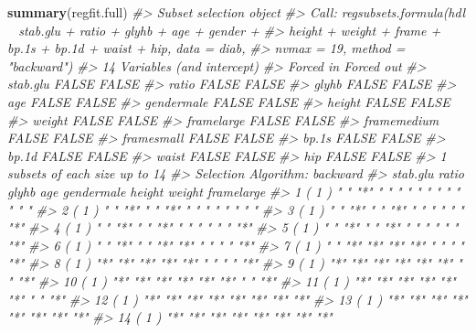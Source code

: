 \documentclass[]{book}
\newenvironment{Shaded}{\begin{snugshade}}{\end{snugshade}}
\newcommand{\CommentTok}[1]{\textcolor[rgb]{0.56,0.35,0.01}{\textit{#1}}}
\newcommand{\KeywordTok}[1]{\textcolor[rgb]{0.13,0.29,0.53}{\textbf{#1}}}
\newcommand{\NormalTok}[1]{#1}
\begin{document}
\begin{Shaded}
\begin{Highlighting}[]
\KeywordTok{summary}\NormalTok{(regfit.full)}
\CommentTok{#> Subset selection object}
\CommentTok{#> Call: regsubsets.formula(hdl ~ stab.glu + ratio + glyhb + age + gender + }
\CommentTok{#>     height + weight + frame + bp.1s + bp.1d + waist + hip, data = diab, }
\CommentTok{#>     nvmax = 19, method = "backward")}
\CommentTok{#> 14 Variables  (and intercept)}
\CommentTok{#>             Forced in Forced out}
\CommentTok{#> stab.glu        FALSE      FALSE}
\CommentTok{#> ratio           FALSE      FALSE}
\CommentTok{#> glyhb           FALSE      FALSE}
\CommentTok{#> age             FALSE      FALSE}
\CommentTok{#> gendermale      FALSE      FALSE}
\CommentTok{#> height          FALSE      FALSE}
\CommentTok{#> weight          FALSE      FALSE}
\CommentTok{#> framelarge      FALSE      FALSE}
\CommentTok{#> framemedium     FALSE      FALSE}
\CommentTok{#> framesmall      FALSE      FALSE}
\CommentTok{#> bp.1s           FALSE      FALSE}
\CommentTok{#> bp.1d           FALSE      FALSE}
\CommentTok{#> waist           FALSE      FALSE}
\CommentTok{#> hip             FALSE      FALSE}
\CommentTok{#> 1 subsets of each size up to 14}
\CommentTok{#> Selection Algorithm: backward}
\CommentTok{#>           stab.glu ratio glyhb age gendermale height weight framelarge}
\CommentTok{#> 1  ( 1 )  " "      "*"   " "   " " " "        " "    " "    " "       }
\CommentTok{#> 2  ( 1 )  " "      "*"   " "   "*" " "        " "    " "    " "       }
\CommentTok{#> 3  ( 1 )  " "      "*"   " "   "*" " "        " "    " "    "*"       }
\CommentTok{#> 4  ( 1 )  " "      "*"   " "   "*" " "        " "    " "    "*"       }
\CommentTok{#> 5  ( 1 )  " "      "*"   " "   "*" " "        " "    " "    "*"       }
\CommentTok{#> 6  ( 1 )  " "      "*"   " "   "*" "*"        " "    " "    "*"       }
\CommentTok{#> 7  ( 1 )  " "      "*"   "*"   "*" "*"        " "    " "    "*"       }
\CommentTok{#> 8  ( 1 )  "*"      "*"   "*"   "*" "*"        " "    " "    "*"       }
\CommentTok{#> 9  ( 1 )  "*"      "*"   "*"   "*" "*"        "*"    " "    "*"       }
\CommentTok{#> 10  ( 1 ) "*"      "*"   "*"   "*" "*"        "*"    " "    "*"       }
\CommentTok{#> 11  ( 1 ) "*"      "*"   "*"   "*" "*"        "*"    " "    "*"       }
\CommentTok{#> 12  ( 1 ) "*"      "*"   "*"   "*" "*"        "*"    "*"    "*"       }
\CommentTok{#> 13  ( 1 ) "*"      "*"   "*"   "*" "*"        "*"    "*"    "*"       }
\CommentTok{#> 14  ( 1 ) "*"      "*"   "*"   "*" "*"        "*"    "*"    "*"       }

\end{Highlighting}
\end{Shaded}
\end{document}
